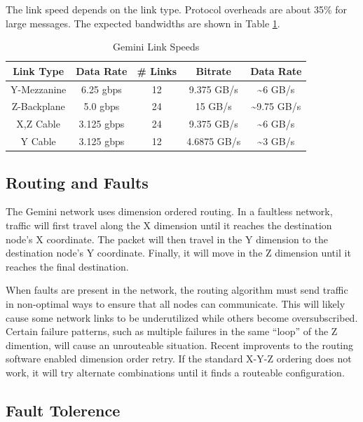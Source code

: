 \documentclass[10pt, conference, compsocconf]{IEEEtran}
\begin{document}
The link speed depends on the link type.  Protocol overheads are about 35\% for
large messages.  The expected bandwidths are shown in Table
\ref{tab:linkspeed}.

\begin{table}[h]
  \centering
  \caption{Gemini Link Speeds}
  \label{tab:linkspeed}
  \begin{tabular}{ | c | c | c | c | c | }
    \hline
    Link Type	& Data Rate	& \# Links	& Bitrate	& Data Rate	\\ \hline \hline
    Y-Mezzanine & 6.25 gbps	& 12		& 9.375 GB/s	& \textasciitilde6 GB/s	\\ \hline
    Z-Backplane & 5.0 gbps	& 24		& 15 GB/s	& \textasciitilde9.75 GB/s	\\ \hline
    X,Z Cable	& 3.125 gbps	& 24		& 9.375 GB/s	& \textasciitilde6 GB/s	\\ \hline
    Y Cable	& 3.125 gbps	& 12		& 4.6875 GB/s	& \textasciitilde3 GB/s	\\ \hline
  \end{tabular}
\end{table}

\subsection{Routing and Faults}

The Gemini network uses dimension ordered routing.  In a faultless network,
traffic will first travel along the X dimension until it reaches the
destination node's X coordinate.  The packet will then travel in the Y
dimension to the destination node's Y coordinate.  Finally, it will move in the
Z dimension until it reaches the final destination. 

When faults are present in the network, the routing algorithm must send traffic
in non-optimal ways to ensure that all nodes can communicate.  This will likely
cause some network links to be underutilized while others become
oversubscribed.  Certain failure patterns, such as multiple failures in the
same ``loop'' of the Z dimention, will cause an unrouteable situation.  Recent
improvents to the routing software enabled dimension order retry.  If the
standard X-Y-Z ordering does not work, it will try alternate combinations until
it finds a routeable configuration.

\subsection{Fault Tolerence}
\end{document}
